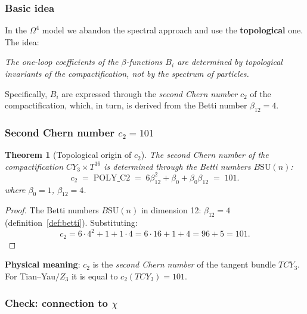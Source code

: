 \documentclass[11pt,a4paper]{article}
\newcommand{\SU}{\ensuremath{\mathrm{SU}}}
\newcommand{\CY}{\ensuremath{CY_3}}
\newcommand{\Om}{\ensuremath{\Omega^4}}
\newtheorem{theorem}{Theorem}[section]
\theoremstyle{definition}
\begin{document}
\subsubsection{Basic idea}

In the $\Om$ model we abandon the spectral approach
and use the \textbf{topological} one. The idea:

\begin{center}
\emph{The one-loop coefficients of the $\beta$-functions $B_i$ are determined
by topological invariants of the compactification, not by the spectrum
of particles.}
\end{center}

Specifically, $B_i$ are expressed through the \emph{second Chern number}
$c_2$ of the compactification, which, in turn, is derived
from the Betti number $\beta_{12} = 4$.

\subsubsection{Second Chern number \texorpdfstring{$c_2 = 101$}{c\_2 = 101}}

\begin{theorem}[Topological origin of $c_2$]
\label{thm:c2-topology}
The second Chern number of the compactification $\CY \times T^{16}$
is determined through the Betti numbers $B\SU(n)$:
\begin{equation}
    \boxed{
    c_2 \;=\; \text{POLY\_C2} \;=\;
    6 \beta_{12}^2 + \beta_0 + \beta_0 \beta_{12} \;=\; 101.
    }
    \label{eq:c2-topology}
\end{equation}
where $\beta_0 = 1$, $\beta_{12} = 4$.
\end{theorem}

\begin{proof}
The Betti numbers $B\SU(n)$ in dimension 12: $\beta_{12} = 4$
(definition~\ref{def:betti}). Substituting:
\begin{equation}
    c_2 = 6 \cdot 4^2 + 1 + 1 \cdot 4 = 6 \cdot 16 + 1 + 4
    = 96 + 5 = 101.
\end{equation}
\end{proof}

\medskip\noindent
\textbf{Physical meaning}: $c_2$ is the \emph{second Chern number}
of the tangent bundle $T\CY$. For Tian--Yau$/Z_3$ it is equal to
$c_2(T\CY) = 101$.

\subsubsection{Check: connection to \texorpdfstring{$\chi$}{}}
\end{document}
